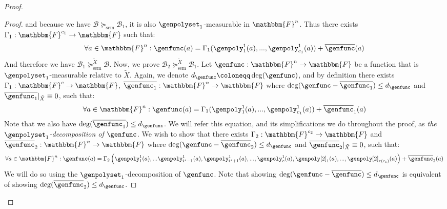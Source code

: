 \documentclass[10pt,a4paper]{article}
\newcommand{\definedas}[0]{\coloneqq}
\newcommand{\parens}[1]{\left( #1 \right)}
\newcommand{\basefield}[0]{\mathbbm{F}}
\newcommand{\blocklength}[0]{n}
\newcommand{\field}[0]{\basefield^{\blocklength}}
\newcommand{\degree}[0]{d}
\newcommand{\funcdef}[3]{#1:#2\rightarrow#3}
\newcommand{\restrictfunc}[2]{#1|_{#2}}
\newcommand{\factor}[0]{\mathcal{B}}
\newcommand{\semrefine}[0]{\succeq_{\text{sem}}}
\newcommand{\relsemrefineex}[1]{\succeq^{#1}_{\text{sem}}}
\newcommand{\relativeremainder}[1]{\overline{#1}}
\newcommand{\variety}{{\tilde{X}}}
\newcommand{\rankfunc}[0]{{{{r}}}}
\begin{document}
\begin{proof}
\begin{proof}
        and because we have $\factor \semrefine \factor_1$, it is also $\genpolyset_1$-measurable in $\field$.
        Thus there exists $\funcdef{\Gamma_1}{\basefield^{c_1}}{\basefield}$ such that:
        \[
            \forall a \in \field: \genfunc(a) = \Gamma_1(\genpoly^{1}_{1}(a),...,\genpoly^{1}_{c_1}(a)) + \relativeremainder{\genfunc}(a)
        \]
        And therefore we have $\factor_1 \relsemrefineex{\variety} \factor$.
        \newline
        Now, we prove $\factor_2 \relsemrefineex{\variety} \factor_1$.
        Let $\funcdef{\genfunc}{\field}{\basefield}$ be a function that is $\genpolyset_1$-measurable relative to $\variety$.
        Again, we denote $\degree_{\genfunc} \definedas \deg(\genfunc)$,
        and by definition there exists $\funcdef{\Gamma_1}{\basefield^c}{\basefield}$,
        $\funcdef{\relativeremainder{\genfunc_1}}{\field}{\basefield}$ where $\deg(\genfunc - \relativeremainder{\genfunc_1}) \leq \degree_{\genfunc}$ and $\restrictfunc{\relativeremainder{\genfunc_1}}{\variety} \equiv 0$, such that:
        \begin{equation} \label{eq:f-decomposition-a}
            \forall a \in \field: \genfunc(a) = \Gamma_1(\genpoly^{1}_{1}(a),...,\genpoly^{1}_{c_1}(a)) + \relativeremainder{\genfunc}_1(a)
        \end{equation}
        Note that we also have $\deg(\relativeremainder{\genfunc_1}) \leq \degree_{\genfunc}$.
        We will refer this equation, and its simplifications we do throughout the proof, as \emph{the $\genpolyset_1$-decomposition of $\genfunc$}.
        \newline
        We wish to show that there exists $\funcdef{\Gamma_2}{\basefield^{c_2}}{\basefield}$ and
        $\funcdef{\relativeremainder{\genfunc}_2}{\field}{\basefield}$ where $\deg(\genfunc - \relativeremainder{\genfunc}_2) \leq \degree_{\genfunc}$ and $\restrictfunc{\relativeremainder{\genfunc}_2}{\variety} \equiv 0$, such that:
        \[
            \forall a \in \field: \genfunc(a) = \Gamma_2 \parens {\genpoly^1_1(a),...\genpoly^1_{i^\star - 1}(a), \genpoly^1_{i^\star + 1}(a),..., \genpoly^1_c(a), \genpoly[2]_1(a),...,\genpoly[2]_{\rankfunc(c_1)}(a)} + \relativeremainder{\genfunc}_2(a)
        \]
        We will do so using the $\genpolyset_1$-decomposition of $\genfunc$.
        Note that showing $\deg(\genfunc - \relativeremainder{\genfunc}) \leq \degree_{\genfunc}$ is equivalent of showing $\deg(\relativeremainder{\genfunc}_2) \leq \degree_{\genfunc}$.
        \newline

\end{proof}
\end{proof}
\end{document}
